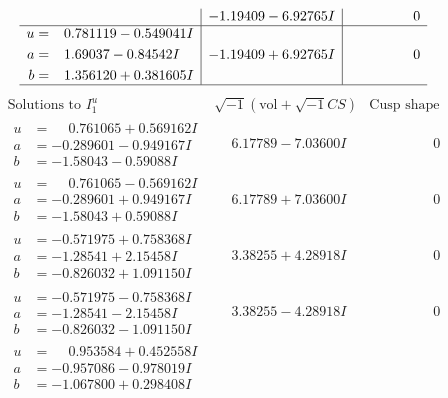 \documentclass[1p]{elsarticle_modified}
\theoremstyle{definition}
\newcommand{\I}{\sqrt{-1}}
\begin{document}
$$\begin{array}{c|c|c}
 & -1.19409 - 6.92765 I & \phantom{-0.000000 } 0 \\ \hline\begin{aligned}
u &= \phantom{-}0.781119 - 0.549041 I \\
a &= \phantom{-}1.69037 - 0.84542 I \\
b &= \phantom{-}1.356120 + 0.381605 I\end{aligned}
 & -1.19409 + 6.92765 I & \phantom{-0.000000 } 0\\
 \hline 
 \end{array}$$\newpage$$\begin{array}{c|c|c}  
\text{Solutions to }I^u_{1}& \I (\text{vol} + \sqrt{-1}CS) & \text{Cusp shape}\\
 \hline 
\begin{aligned}
u &= \phantom{-}0.761065 + 0.569162 I \\
a &= -0.289601 - 0.949167 I \\
b &= -1.58043 - 0.59088 I\end{aligned}
 & \phantom{-}6.17789 - 7.03600 I & \phantom{-0.000000 } 0 \\ \hline\begin{aligned}
u &= \phantom{-}0.761065 - 0.569162 I \\
a &= -0.289601 + 0.949167 I \\
b &= -1.58043 + 0.59088 I\end{aligned}
 & \phantom{-}6.17789 + 7.03600 I & \phantom{-0.000000 } 0 \\ \hline\begin{aligned}
u &= -0.571975 + 0.758368 I \\
a &= -1.28541 + 2.15458 I \\
b &= -0.826032 + 1.091150 I\end{aligned}
 & \phantom{-}3.38255 + 4.28918 I & \phantom{-0.000000 } 0 \\ \hline\begin{aligned}
u &= -0.571975 - 0.758368 I \\
a &= -1.28541 - 2.15458 I \\
b &= -0.826032 - 1.091150 I\end{aligned}
 & \phantom{-}3.38255 - 4.28918 I & \phantom{-0.000000 } 0 \\ \hline\begin{aligned}
u &= \phantom{-}0.953584 + 0.452558 I \\
a &= -0.957086 - 0.978019 I \\
b &= -1.067800 + 0.298408 I\end{aligned}

\end{array}$$
\end{document}
